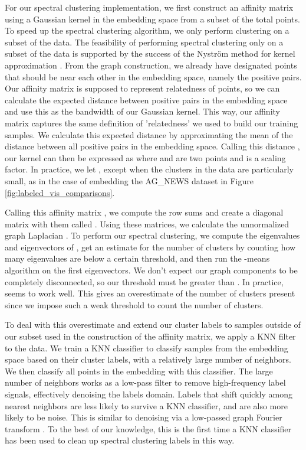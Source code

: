 \documentclass{article}
\begin{document}
For our spectral clustering implementation, we first construct an affinity matrix using a Gaussian kernel in the embedding space from a subset of the total points. To speed up the spectral clustering algorithm, we only perform clustering on a subset of the data. The feasibility of performing spectral clustering only on a subset of the data is supported by the success of the Nystr{\"o}m method for kernel approximation \cite{williams2001using}. From the graph construction, we already have designated points that should be near each other in the embedding space, namely the positive pairs. Our affinity matrix is supposed to represent relatedness of points, so we can calculate the expected distance between positive pairs in the embedding space and use this as the bandwidth of our Gaussian kernel. This way, our affinity matrix captures the same definition of 'relatedness' we used to build our training samples. We calculate this expected distance by approximating the mean of the distance between all positive pairs in the embedding space. Calling this distance , our kernel can then be expressed as  where  and  are two points and  is a scaling factor. In practice, we let , except when the clusters in the data are particularly small, as in the case of embedding the AG\_NEWS dataset in Figure \ref{fig:labeled_vis_comparisons}.

Calling this affinity matrix , we compute the row sums and create a diagonal matrix with them called . Using these matrices, we calculate the unnormalized graph Laplacian  \cite{von2007tutorial}. To perform our spectral clustering, we compute the eigenvalues and eigenvectors of , get an estimate for the number of clusters  by counting how many eigenvalues are below a certain threshold, and then run the -means algorithm on the first  eigenvectors. We don't expect our graph components to be completely disconnected, so our threshold must be greater than  \cite{von2007tutorial}. In practice,  seems to work well. This gives an overestimate of the number of clusters present since we impose such a weak threshold to count the number of clusters.

To deal with this overestimate and extend our cluster labels to samples outside of our subset used in the construction of the affinity matrix, we apply a KNN filter to the data. We train a KNN classifier to classify samples from the embedding space based on their cluster labels, with a relatively large number of neighbors. We then classify all points in the embedding with this classifier. The large number of neighbors works as a low-pass filter to remove high-frequency label signals, effectively denoising the labels domain. Labels that shift quickly among nearest neighbors are less likely to survive a KNN classifier, and are also more likely to be noise. This is similar to denoising via a low-passed graph Fourier transform \cite{6808520}. To the best of our knowledge, this is the first time a KNN classifier has been used to clean up spectral clustering labels in this way.
\end{document}
